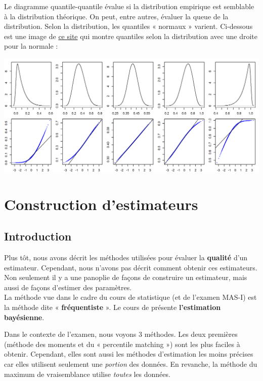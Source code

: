 \documentclass[10pt, french]{article}
\begin{document}
\begin{multicols*}{2}
Le diagramme quantile-quantile évalue si la distribution empirique est semblable à la distribution théorique. On peut, entre autres, évaluer la queue de la distribution. Selon la distribution, les quantiles « normaux » varient. Ci-dessous est une image de \href{https://mgimond.github.io/ES218/Week06a.html}{ce site} qui montre quantiles selon la distribution avec une droite pour la normale :
\begin{center}
	\includegraphics[scale=0.5]{../../src/ACT-2000/qqplot-skeweing.png}
\end{center}



\columnbreak
\section{Construction d'estimateurs}
\subsection{Introduction}
\begin{rappel_enhanced}[Contexte]
Plus tôt, nous avons décrit les méthodes utilisées pour évaluer la \textbf{qualité} d'un estimateur. Cependant, nous n'avons pas décrit comment obtenir ces estimateurs. Non seulement il y a une panoplie de façons de construire un estimateur, mais aussi de façons d'estimer des paramètres. \\

La méthode vue dans le cadre du cours de statistique (et de l'examen MAS-I) est la méthode dite « \textbf{fréquentiste} ». Le cours de  présente \textbf{l'estimation bayésienne}.
\end{rappel_enhanced}


Dans le contexte de l'examen, nous voyons 3 méthodes. Les deux premières (méthode des moments et du « percentile matching ») sont les plus faciles à obtenir. Cependant, elles sont aussi les méthodes d'estimation les moins précises car elles utilisent seulement une \textit{portion} des données. En revanche, la méthode du maximum de vraisemblance utilise \textit{toutes} les données.	\\


\end{multicols*}
\end{document}
